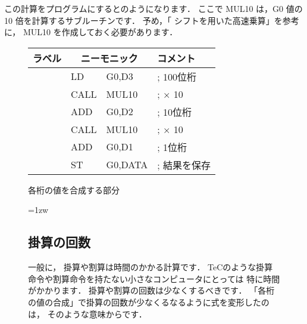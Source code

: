 この計算をプログラムにするとのようになります．
ここで MUL10 は，G0 値の 10 倍を計算するサブルーチンです．
予め，「 シフトを用いた高速乗算」を参考に，
MUL10 を作成しておく必要があります．

\begin{figure}[bpt]
{\small\tt\begin{center}
\begin{tabular}{|l|l l l|} \hline
ラベル & \multicolumn{2}{|c}{ニーモニック} & コメント    \\
\hline
       & LD   & G0,D3         & ; 100位桁    \\
       & CALL & MUL10         & ; × 10      \\
       & ADD  & G0,D2         & ; 10位桁     \\
       & CALL & MUL10         & ; × 10      \\
       & ADD  & G0,D1         & ; 1位桁      \\
       & ST   & G0,DATA       & ; 結果を保存 \\
\hline
\end{tabular}
\end{center}}
\caption{各桁の値を合成する部分}
\label{fig:chap6:gousei}
\end{figure}

\begin{figure}[btp]
\begin{framed}{\parindent=1zw
\subsection*{掛算の回数}
一般に，
掛算や割算は時間のかかる計算です．
TeCのような掛算命令や割算命令を持たない小さなコンピュータにとっては
特に時間がかかります．
掛算や割算の回数は少なくするべきです．
「各桁の値の合成」で掛算の回数が少なくるなるように式を変形したのは，
そのような意味からです．
}\end{framed}
\end{figure}

\newpage
